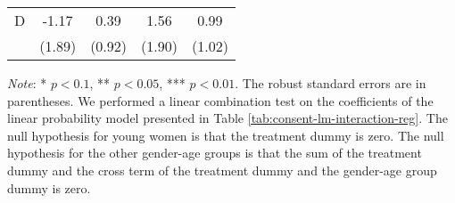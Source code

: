 \documentclass[12pt, a4paper]{article}
\begin{document}
\begin{table}[H]
\begin{threeparttable}
\begin{tabular}[t]{lcccc}
\hspace{1em}D & -1.17 & 0.39 & 1.56 & 0.99\\
\hspace{1em} & (1.89) & (0.92) & (1.90) & (1.02)\\
\bottomrule
\end{tabular}
\begin{tablenotes}
\item \emph{Note}: * $p < 0.1$, ** $p < 0.05$, *** $p < 0.01$. The robust standard errors are in parentheses. We performed a linear combination test on the coefficients of the linear probability model presented in Table \ref{tab:consent-lm-interaction-reg}. The null hypothesis for young women is that the treatment dummy is zero. The null hypothesis for the other gender-age groups is that the sum of the treatment dummy and the cross term of the treatment dummy and the gender-age group dummy is zero.
\end{tablenotes}
\end{threeparttable}
\end{table}
\end{document}
